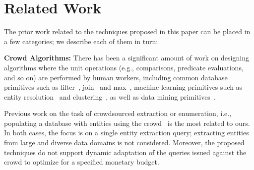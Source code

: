 

\section{Related Work}
\label{sec:related}
The prior work related to the techniques proposed in this paper can be placed in a few categories; we describe each of them in turn:

\vspace{3pt}\noindent\textbf{Crowd Algorithms:} There has been a significant amount of work on designing algorithms where the unit operations (e.g., comparisons, predicate evaluations, and so on) are performed by human workers, including common database primitives such as filter~\cite{crowdscreen}, join~\cite{markus-sorts-joins} and max~\cite{so-who-won},  machine learning primitives such as entity resolution~\cite{entity-matching, crowder} and clustering~\cite{crowdclustering}, as well as data mining primitives~\cite{amsterdamer:2013, get-another-label}. 

Previous work on the task of crowdsourced extraction or enumeration, i.e., populating a database with entities using the crowd~\cite{park:2014, trushkowsky:2013} is the most related to ours. In both cases, the focus is on a single entity extraction query; extracting entities from large and diverse data domains is not considered. Moreover, the proposed techniques do not support  dynamic adaptation of the queries issued against the crowd to optimize for a specified monetary budget. 


